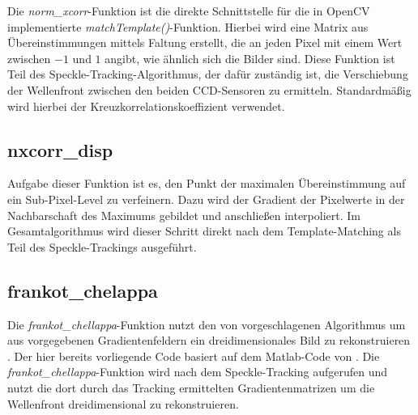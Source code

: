 Die \textit{norm\_xcorr}-Funktion ist die direkte Schnittstelle für die in OpenCV implementierte \textit{matchTemplate()}-Funktion. Hierbei wird eine Matrix aus Übereinstimmungen mittels Faltung erstellt, die an jeden Pixel mit einem Wert zwischen $-1$ und $1$ angibt, wie ähnlich sich die Bilder sind. Diese Funktion ist Teil des Speckle-Tracking-Algorithmus, der dafür zuständig ist, die Verschiebung der Wellenfront zwischen den beiden \gls{CCD}-Sensoren zu ermitteln. Standardmäßig wird hierbei der Kreuzkorrelationskoeffizient verwendet. 

\subsection{nxcorr\_disp}

Aufgabe dieser Funktion ist es, den Punkt der maximalen Übereinstimmung auf ein Sub-Pixel-Level zu verfeinern. Dazu wird der Gradient der Pixelwerte in der Nachbarschaft des Maximums gebildet und anschließen interpoliert. Im Gesamtalgorithmus wird dieser Schritt direkt nach dem Template-Matching als Teil des Speckle-Trackings ausgeführt.

\subsection{frankot\_chelappa}

Die \textit{frankot\_chellappa}-Funktion nutzt den von \citeauthor{FC88} vorgeschlagenen Algorithmus um aus vorgegebenen Gradientenfeldern ein dreidimensionales Bild zu rekonstruieren \cite{FC88}. Der hier bereits vorliegende Code basiert auf dem Matlab-Code von \citeauthor{Kov04} \cite{Kov04}. Die \textit{frankot\_chellappa}-Funktion wird nach dem Speckle-Tracking aufgerufen und nutzt die dort durch das Tracking ermittelten Gradientenmatrizen um die Wellenfront dreidimensional zu rekonstruieren. 